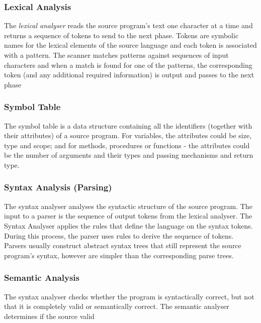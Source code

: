 \subsubsection{Lexical Analysis}
The \textit{lexical analyser} reads the source program's text one character at a time and returns a sequence of tokens to send to the next phase. Tokens are symbolic names for the lexical elements of the source language and each token is associated with a pattern. The scanner matches patterns against sequences of input characters and when a match is found for one of the patterns, the corresponding token (and any additional required information) is output and passes to the next phase

\subsubsection{Symbol Table}
The symbol table is a data structure containing all the identifiers (together with their attributes) of a source program. For variables, the attributes could be size, type and scope; and for methods, procedures or functions - the attributes could be the number of arguments and their types and passing mechanisms and return type. 

\subsubsection{Syntax Analysis (Parsing)}
The syntax analyser analyses the syntactic structure of the source program. The input to a parser is the sequence of output tokens from the lexical analyser. The Syntax Analyser applies the rules that define the language on the syntax tokens. During this process, the parser uses rules to derive the sequence of tokens. Parsers usually construct abstract syntax trees that still represent the source program's syntax, however are simpler than the corresponding parse trees. 

\subsubsection{Semantic Analysis}
The syntax analyser checks whether the program is syntactically correct, but not that it is completely valid or semantically correct. The semantic analyser determines if the source valid 